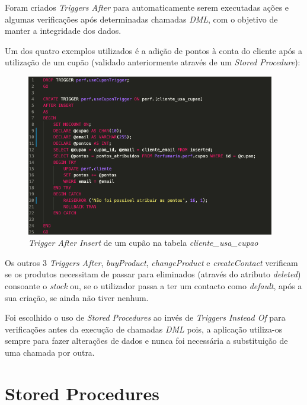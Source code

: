 \documentclass[10pt,portuguese]{article}
\begin{document}
\par Foram criados \textit{Triggers After} para automaticamente serem executadas ações e algumas verificações após determinadas chamadas \textit{DML}, com o objetivo de manter a integridade dos dados.

\par Um dos quatro exemplos utilizados é a adição de pontos à conta do cliente após a utilização de um cupão (validado anteriormente através de um \textit{Stored Procedure}):

\begin{figure}[!h]
    \centering
    \includegraphics[width=410]{images/useCuponTrigger.png}
    \caption{\textit{Trigger After Insert} de um cupão na tabela \textit{cliente\_usa\_cupao}}
\end{figure}

\par Os outros 3 \textit{Triggers After}, \textit{buyProduct}, \textit{changeProduct} e \textit{createContact} verificam se os produtos necessitam de passar para eliminados (através do atributo \textit{deleted}) consoante o \textit{stock} ou, se o utilizador passa a ter um contacto como \textit{default}, após a sua criação, se ainda não tiver nenhum.

\par Foi escolhido o uso de \textit{Stored Procedures} ao invés de \textit{Triggers Instead Of} para verificações antes da execução de chamadas \textit{DML} pois, a aplicação utiliza-os sempre para fazer alterações de dados e nunca foi necessária a substituição de uma chamada por outra.

\clearpage

\section{Stored Procedures}
\end{document}
